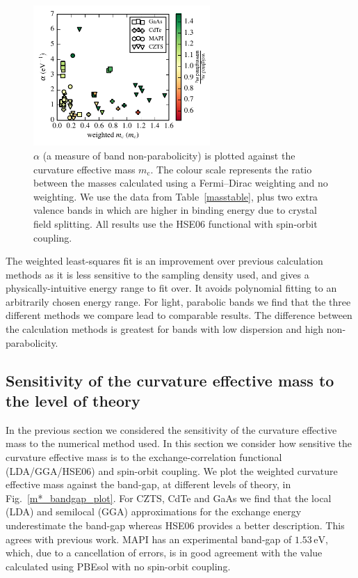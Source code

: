 \begin{figure}[tb]\centering
\includegraphics[width=0.6\textwidth]{./figures/ch4/mass_alpha_ratio.pdf}
\caption[Plot of band non-parabolicity against effective mass]{\label{mass_alpha_ratio}$\alpha$ (a measure of band non-parabolicity) is plotted against the curvature effective mass $m_\text{c}$. The colour scale represents the ratio between the masses calculated using a Fermi--Dirac weighting and no weighting. We use the data from Table\ \ref{masstable}, plus two extra valence bands in  which are higher in binding energy due to crystal field splitting. All results use the HSE06 functional with spin-orbit coupling.} 
\end{figure}

The weighted least-squares fit is an improvement over previous calculation methods as it is less sensitive to the sampling density used, and gives a physically-intuitive energy range to fit over. 
It avoids polynomial fitting to an arbitrarily chosen energy range. 
For light, parabolic bands we find that the three different methods we compare lead to comparable results.
The difference between the calculation methods is greatest for bands with low dispersion and high non-parabolicity.

\subsection{Sensitivity of the curvature effective mass to the level of theory}

In the previous section we considered the sensitivity of the curvature effective mass to the numerical method used.
In this section we consider how sensitive the curvature effective mass is to the exchange-correlation functional (LDA/GGA/HSE06) and spin-orbit coupling.
We plot the weighted curvature effective mass against the band-gap, at different levels of theory, in Fig.\ \ref{m*_bandgap_plot}. 
For CZTS, CdTe and GaAs we find that the local (LDA) and semilocal (GGA) approximations for the exchange energy underestimate the band-gap whereas HSE06 provides a better description. This agrees with previous work.\autocite{Deak2010,Heyd2003}
MAPI has an experimental band-gap of $1.53\,\mathrm{eV}$,\autocite{Liu2015} which, due to a cancellation of errors, is in good agreement with the value calculated using PBEsol with no spin-orbit coupling. 

